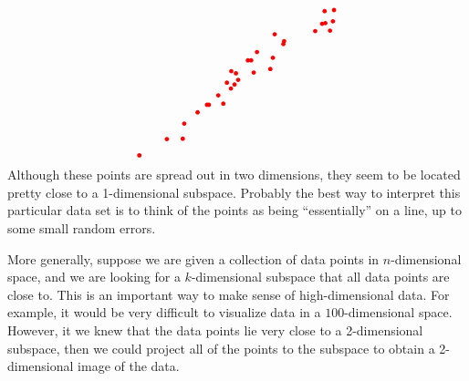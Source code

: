 \documentclass{ximera}
\begin{document}
\begin{equation}
\begin{tikzpicture}[baseline=-0.5ex]
    \fill[color=red] (2.35,1.85) circle (0.06);
    \fill[color=red] (0.85,0.25) circle (0.06);
    \fill[color=red] (-0.23,0.19) circle (0.06);
    \fill[color=red] (-0.90,-0.74) circle (0.06);
    \fill[color=red] (2.50,1.31) circle (0.06);
    \fill[color=red] (-0.45,-0.71) circle (0.06);
    \fill[color=red] (0.92,0.56) circle (0.06);
    \fill[color=red] (0.97,1.21) circle (0.06);
    \fill[color=red] (-0.85,-0.74) circle (0.06);
    \fill[color=red] (-0.10,0.13) circle (0.06);
    \fill[color=red] (0.32,0.49) circle (0.06);
    \fill[color=red] (2.58,1.57) circle (0.06);
    \fill[color=red] (-0.59,-0.48) circle (0.06);
    \fill[color=red] (2.28,1.50) circle (0.06);
    \fill[color=red] (1.21,0.94) circle (0.06);
    \fill[color=red] (-0.35,-0.13) circle (0.06);
    \fill[color=red] (-1.53,-1.26) circle (0.06);
    \fill[color=red] (-2.77,-2.14) circle (0.06);
    \fill[color=red] (1.23,1.02) circle (0.06);
    \fill[color=red] (2.61,1.88) circle (0.06);
    \fill[color=red] (-0.04,-0.05) circle (0.06);
    \fill[color=red] (2.09,1.30) circle (0.06);
    \fill[color=red] (2.37,1.52) circle (0.06);
    \fill[color=red] (-2.01,-1.69) circle (0.06);
    \fill[color=red] (0.48,0.72) circle (0.06);
    \fill[color=red] (0.23,0.49) circle (0.06);
    \fill[color=red] (-1.16,-0.95) circle (0.06);
    \fill[color=red] (-0.14,-0.18) circle (0.06);
    \fill[color=red] (-1.57,-1.68) circle (0.06);
    \fill[color=red] (0.39,0.15) circle (0.06);
    \fill[color=red] (-0.24,-0.29) circle (0.06);
  \end{tikzpicture}
\end{equation}
Although these points are spread out in two dimensions, they seem to
be located pretty close to a 1-dimensional subspace. Probably the best
way to interpret this particular data set is to think of the points as
being ``essentially'' on a line, up to some small random errors.

More generally, suppose we are given a collection of data points in
$n$-dimensional space, and we are looking for a $k$-dimensional
subspace that all data points are close to.  This is an important way
to make sense of high-dimensional data. For example, it would be very
difficult to visualize data in a $100$-dimensional space. However, it
we knew that the data points lie very close to a 2-dimensional
subspace, then we could project all of the points to the subspace to
obtain a 2-dimensional image of the data.
\end{document}
